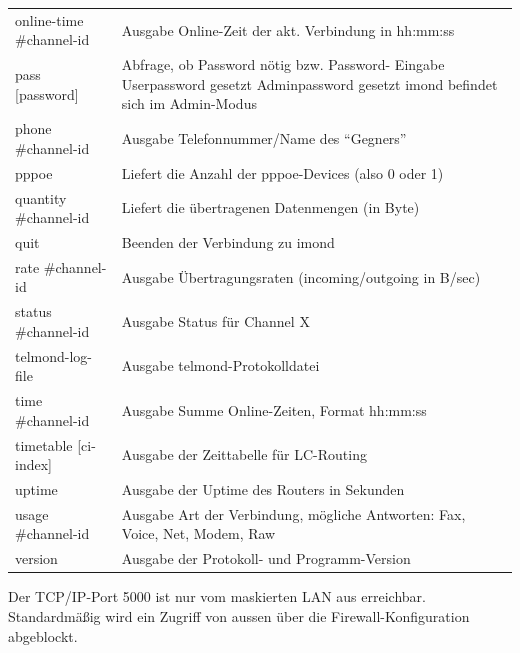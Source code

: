 \begin{table}
\begin{tabular}{lp{9cm}}
      online-time \#channel-id  & Ausgabe Online-Zeit der akt. Verbindung in
                                  hh:mm:ss\\
      pass [password]           & Abfrage, ob Password nötig bzw. Password-
                                  Eingabe\newline
                                  1 Userpassword gesetzt\newline
                                  2 Adminpassword gesetzt\newline
                                  4 imond befindet sich im Admin-Modus\\
      phone \#channel-id        & Ausgabe Telefonnummer/Name des ``Gegners''\\
      pppoe                     & Liefert die Anzahl der pppoe-Devices (also 0
                                  oder 1)\\
      quantity \#channel-id     & Liefert die übertragenen Datenmengen (in
                                  Byte)\\
      quit                      & Beenden der Verbindung zu imond\\
      rate \#channel-id         & Ausgabe Übertragungsraten (incoming/outgoing
                                  in B/sec)\\
      status \#channel-id       & Ausgabe Status für Channel X\\
      telmond-log-file          & Ausgabe telmond-Protokolldatei\\
      time \#channel-id         & Ausgabe Summe Online-Zeiten, Format
                                  hh:mm:ss\\
      timetable [ci-index]      & Ausgabe der Zeittabelle für LC-Routing\\
      uptime                    & Ausgabe der Uptime des Routers in Sekunden\\
      usage \#channel-id        & Ausgabe Art der Verbindung, mögliche
                                  Antworten: Fax, Voice, Net, Modem, Raw\\
      version                   & Ausgabe der Protokoll- und
                                  Programm-Version\\
    \end{tabular}
  \end{table}


  Der TCP/IP-Port 5000 ist nur vom maskierten LAN aus erreichbar.
  Standardmäßig wird ein Zugriff von aussen über die
  Firewall-Konfiguration abgeblockt.

